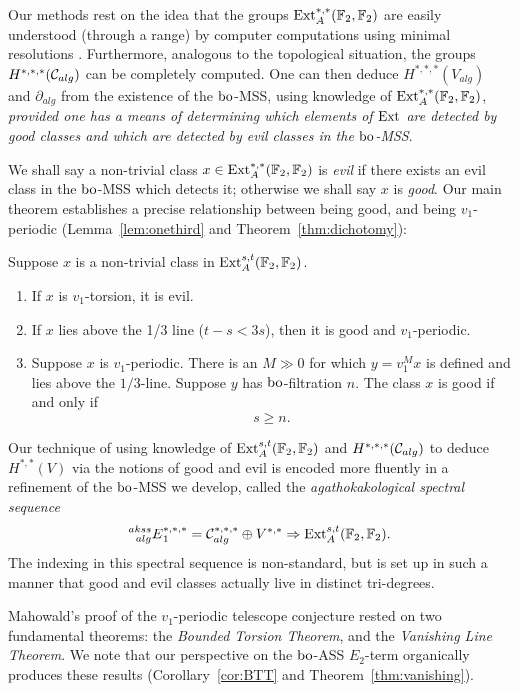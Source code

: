 Our methods rest on the idea that the groups 
$\operatorname{Ext}^{*,*}_{A}(\mathbb{F}_2, \mathbb{F}_2)$ are easily understood (through a range) by computer computations using minimal resolutions \cite{Bruner}.  Furthermore, analogous to the topological situation, the groups $H^{*,*,*}(\mathcal{C}_{alg})$ can be completely computed.  One can then deduce $H^{*,*,*}(V_{alg})$ and $\partial_{alg}$ from the existence of the $\mathrm{bo}$-MSS, using knowledge of $\operatorname{Ext}^{*,*}_{A}(\mathbb{F}_2, \mathbb{F}_2)$,  \emph{provided one has a means of determining which elements of $\operatorname{Ext}$ are detected by good classes and which are detected by evil classes in the $\mathrm{bo}$-MSS}.  

We shall say a non-trivial class $x \in \operatorname{Ext}^{*,*}_{A}(\mathbb{F}_2, \mathbb{F}_2)$ is \emph{evil} if there exists an evil class in the $\mathrm{bo}$-MSS which detects it; otherwise we shall say $x$ is \emph{good}.
Our main theorem establishes a precise relationship between being good, and being $v_1$-periodic (Lemma~\ref{lem:onethird} and Theorem~\ref{thm:dichotomy}):


\begin{thm*}
Suppose $x$ is a non-trivial class in $\operatorname{Ext}^{s,t}_{A}(\mathbb{F}_2, \mathbb{F}_2)$.
\begin{enumerate}
\item 
If $x$ is $v_1$-torsion, it is evil.

\item If $x$ lies above the 1/3 line ($t-s < 3s$), then it is good and $v_1$-periodic.

\item 
Suppose $x$ is $v_1$-periodic.  There is an $M \gg 0$ for which $y = v_1^{M} x$ is defined and lies above the $1/3$-line.  Suppose $y$ has $\mathrm{bo}$-filtration $n$.  The class $x$ is good if and only if 
$$ s \ge n. $$
\end{enumerate}
\end{thm*}

Our technique of using knowledge of $\operatorname{Ext}^{s,t}_{A}(\mathbb{F}_2, \mathbb{F}_2)$ and $H^{*,*,*}(\mathcal{C}_{alg})$ to deduce $H^{*,*}(V)$ via the notions of good and evil is encoded more fluently in a refinement of the $\mathrm{bo}$-MSS we develop, called the \emph{agathokakological spectral sequence}
$$ \prescript{akss}{alg}{E}^{*,*,*}_1 = \mathcal{C}_{alg}^{*,*,*} \oplus V^{*,*} \Rightarrow \operatorname{Ext}^{s,t}_{A}(\mathbb{F}_2, \mathbb{F}_2). $$
The indexing in this spectral sequence is non-standard, but is set up in such a manner that good and evil classes actually live in distinct tri-degrees.

Mahowald's proof of the $v_1$-periodic telescope conjecture \cite{Mahowaldbo} rested on two fundamental theorems: the \emph{Bounded Torsion Theorem}, and the \emph{Vanishing Line Theorem}.  We note that our perspective on the $\mathrm{bo}$-ASS $E_2$-term organically produces these results (Corollary~\ref{cor:BTT} and Theorem~\ref{thm:vanishing}).


